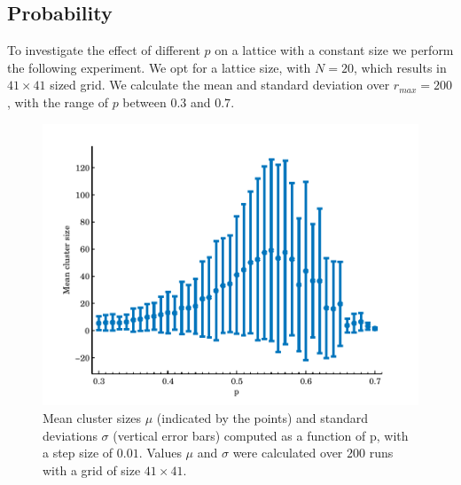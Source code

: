 

\subsection{Probability}
\label{ss:exp:probability}

To investigate the effect of different $p$ on a lattice with a constant size we perform the following experiment. We opt for a lattice size, with $N = 20$, which results in $41 \times 41$ sized grid. We calculate the mean and standard deviation over $r_{max} = 200$, with the range of $p$ between $0.3$ and $0.7$.

\begin{figure}
	\centering
	\includegraphics[width=\textwidth]{./img/assignment_a_mean_std_p.pdf}
	\caption{Mean cluster sizes $\mu$ (indicated by the points) and standard deviations $\sigma$ (vertical error bars) computed as a function of p, with a step size of $0.01$. Values $\mu$ and $\sigma$ were calculated over $200$ runs with a grid of size $41 \times 41$.}
	\label{fig:experiment:mean_std_clusters}
\end{figure}

